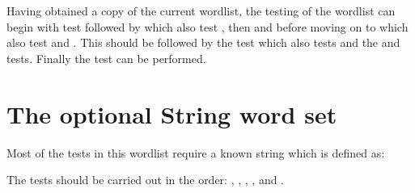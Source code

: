 Having obtained a copy of the current wordlist, the testing of the
wordlist can begin with test  followed
by  which also test , then
 and  before moving on to
 which also test  and
.  This should be followed by the test
 which also tests  and the
 and  tests.
Finally the  test can be performed.

\cbend
{}


\section{The optional String word set} %

\cbstart{}
Most of the tests in this wordlist require a known string which is
defined as:


The tests should be carried out in the order:
,
,
,
,
 and
.

\cbend
{}




\endinput %

\section{Test Harness} %

